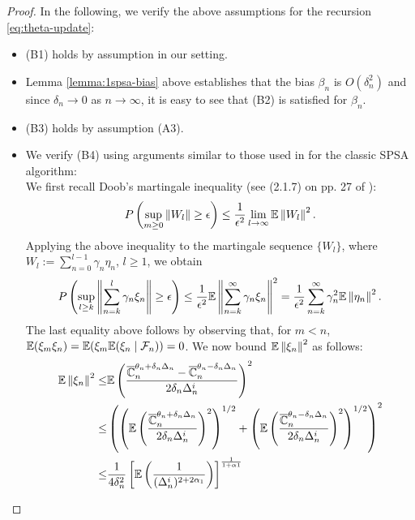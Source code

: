 \begin{proof}
In the following, we verify the above assumptions for the recursion \eqref{eq:theta-update}:
\begin{itemize}
\item (B1) holds by assumption in our setting.

\item Lemma \ref{lemma:1spsa-bias} above establishes that the bias $\beta_n$ is $O(\delta_n^2)$ and since $\delta_n \rightarrow 0$ as $n\rightarrow \infty$, it is easy to see that (B2) is satisfied for $\beta_n$. 

\item (B3) holds by assumption (A3).

\item We verify (B4) using arguments similar to those used in \cite{spall} for the classic SPSA algorithm:\\
We first recall Doob's martingale inequality (see (2.1.7) on pp. 27 of \cite{kushner-clark}):
\begin{align}
P\left( \sup_{m\geq 0}   \left\|W_l\right\| \geq \epsilon \right) \le \dfrac{1}{\epsilon^2} \lim_{l\rightarrow \infty} \mathbb{E} \left\|W_l\right\|^2. 
\end{align}
Applying the above inequality to the martingale sequence $\{W_l\}$, where  $W_l := \sum_{n=0}^{l-1} \gamma_n \eta_n$, $l\ge 1$, we obtain
\begin{align}
P\left( \sup_{l\geq k}   \left\|\sum_{n=k}^{l} \gamma_n \xi_n\right\| \geq \epsilon \right) \le \dfrac{1}{\epsilon^2} \mathbb{E} \left\|
\sum_{n=k}^{\infty} \gamma_n \xi_n\right\|^2 = \dfrac{1}{\epsilon^2} \sum_{n=k}^{\infty} \gamma_n^2 \mathbb{E}\left\| \eta_n\right\|^2. \label{eq:b4}
\end{align}
The last equality above follows by observing that, for $m < n$, $\mathbb{E}(\xi_m \xi_n) = \mathbb{E}(\xi_m \mathbb{E}(\xi_n\mid \mathcal{F}_n))=0$.
We now bound $\mathbb{E}\left\| \xi_n\right\|^2$ as follows:
\begin{align}
\E\left\| \xi_n\right\|^2\le &\E\left(\dfrac{\overline \C_n^{\theta_n + \delta_n \Delta_n} -\overline \C_n^{\theta_n - \delta_n \Delta_n}}{2 \delta_n \Delta_n^i}\right)^2 \label{eq:mi}\\
\le &\left(\left(\E\left(\dfrac{\overline \C_n^{\theta_n + \delta_n \Delta_n}}{2 \delta_n \Delta_n^i}\right)^2\right)^{1/2}
+ \left(\E\left(\dfrac{\overline \C_n^{\theta_n - \delta_n \Delta_n}}{2 \delta_n \Delta_n^i}\right)^2\right)^{1/2}\right)^2 \label{eq:minko}\\
\le &\frac1{4\delta_n^2} \left[ \E\left(\frac1{(\Delta_n^i)^{2+2\alpha_1}}\right) \right]^{\frac{1}{1+\alpha1}} \nonumber\\

\end{align}
\end{itemize}
\end{proof}
